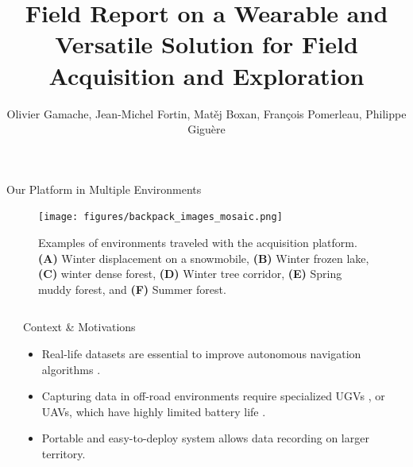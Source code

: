 \documentclass[final,hyperref={pdfpagelabels=false}]{beamer}
\title{\huge Field Report on a Wearable and Versatile Solution for Field Acquisition and Exploration} %
\author{\normalsize Olivier Gamache, Jean-Michel Fortin, Mat\v ej Boxan, François Pomerleau, Philippe Giguère} %
\institute{\small Northern Robotics Laboratory, Universit\'e Laval} %
\begin{document}

\begin{frame}[t] %

\begin{block}{Our Platform in Multiple Environments}
	\begin{figure}
	\texttt{[image: figures/backpack\_images\_mosaic.png]}%
		\captionsetup{width = 0.975\linewidth, justification=justified, name=Figure 1}
		\caption{
			Examples of environments traveled with the acquisition platform. \textbf{(A)} Winter displacement on a snowmobile, \textbf{(B)} Winter frozen lake, \textbf{(C)} winter dense forest, \textbf{(D)} Winter tree corridor, \textbf{(E)} Spring muddy forest, and \textbf{(F)} Summer forest.
		}
		\label{fig:mosaic}
	\end{figure}
\end{block}

\begin{columns}[t] %


\begin{column}{.0125\textwidth}\end{column} %

\begin{column}{.465\textwidth} %

\vspace{-12.5mm}


\begin{block}{Context \& Motivations}
\begin{itemize}
	\item Real-life datasets are essential to improve autonomous navigation algorithms \cite{liu2024botanicgarden}.
	\item Capturing data in off-road environments require specialized \acp{UGV} \cite{Baril2022}, or \ac{UAVs}, which have highly limited battery life \cite{mozaffari2019tutorial}.
	\item Portable and easy-to-deploy system allows data recording on larger territory.
\end{itemize}
\end{block}


\end{column}
\end{columns}
\end{frame}
\end{document}
